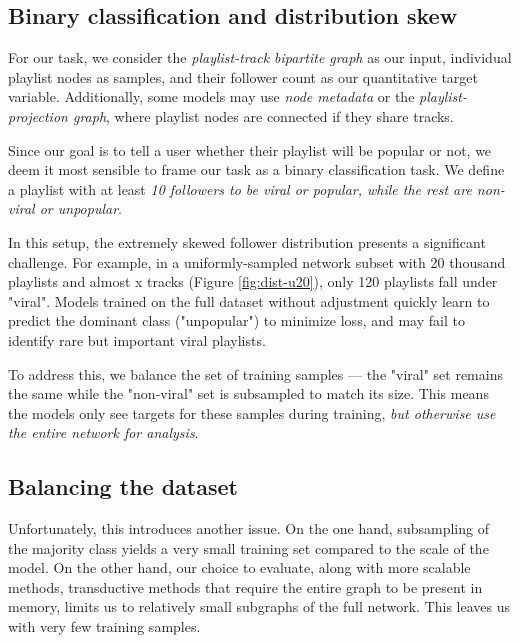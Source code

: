 \documentclass[9pt,twocolumn,twoside]{pnas-report}
\begin{document}
\subsection{Binary classification and distribution skew}
For our task, we consider the \textit{playlist-track bipartite graph} as our input, individual playlist nodes as samples, and their follower count as our quantitative target variable.
Additionally, some models may use \textit{node metadata} or the \textit{playlist-projection graph}, where playlist nodes are connected if they share tracks.

Since our goal is to tell a user whether their playlist will be popular or not, we deem it most sensible to frame our task as a binary classification task. We define a playlist with at least \textit{10 followers to be viral or popular, while the rest are non-viral or unpopular}. 

In this setup, the extremely skewed follower distribution presents a significant challenge. For example, in a uniformly-sampled network subset with 20 thousand playlists and almost x tracks (Figure \ref{fig:dist-u20}), only 120 playlists fall under "viral". Models trained on the full dataset without adjustment
quickly learn to predict the dominant class ("unpopular") to minimize loss, and may fail to identify rare but important viral playlists.

To address this, we balance the set of training samples --- the "viral" set remains the same while the "non-viral" set is subsampled to match its size. This means the models only see targets for these samples during training, \textit{but otherwise use the entire network for analysis}.

\subsection{Balancing the dataset}

Unfortunately, this introduces another issue. On the one hand, subsampling of the majority class yields a very small training set compared to the scale of the model. On the other hand, our choice to evaluate, along with more scalable methods, transductive methods that require the entire graph to be present in memory, limits us to relatively small subgraphs of the full network. This leaves us with very few training samples.
\end{document}
